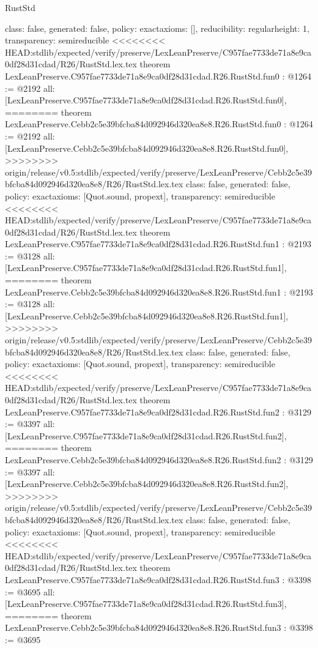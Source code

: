 \begin{lexlean}{RustStd}
\begin{coremodule}
{\begin{coremodule}
{{{  class: false,
  generated: false,
  policy: exact{axioms: []},
  reducibility: regular{height: 1},
  transparency: semireducible
}
<<<<<<<< HEAD:stdlib/expected/verify/preserve/LexLeanPreserve/C957fae7733de71a8e9ca0df28d31cdad/R26/RustStd.lex.tex
theorem LexLeanPreserve.C957fae7733de71a8e9ca0df28d31cdad.R26.RustStd.fun0 : @1264 := @2192 {
  all: [LexLeanPreserve.C957fae7733de71a8e9ca0df28d31cdad.R26.RustStd.fun0],
========
theorem LexLeanPreserve.Cebb2c5e39bfcba84d092946d320ea8e8.R26.RustStd.fun0 : @1264 := @2192 {
  all: [LexLeanPreserve.Cebb2c5e39bfcba84d092946d320ea8e8.R26.RustStd.fun0],
>>>>>>>> origin/release/v0.5:stdlib/expected/verify/preserve/LexLeanPreserve/Cebb2c5e39bfcba84d092946d320ea8e8/R26/RustStd.lex.tex
  class: false,
  generated: false,
  policy: exact{axioms: [Quot.sound, propext]},
  transparency: semireducible
}
<<<<<<<< HEAD:stdlib/expected/verify/preserve/LexLeanPreserve/C957fae7733de71a8e9ca0df28d31cdad/R26/RustStd.lex.tex
theorem LexLeanPreserve.C957fae7733de71a8e9ca0df28d31cdad.R26.RustStd.fun1 : @2193 := @3128 {
  all: [LexLeanPreserve.C957fae7733de71a8e9ca0df28d31cdad.R26.RustStd.fun1],
========
theorem LexLeanPreserve.Cebb2c5e39bfcba84d092946d320ea8e8.R26.RustStd.fun1 : @2193 := @3128 {
  all: [LexLeanPreserve.Cebb2c5e39bfcba84d092946d320ea8e8.R26.RustStd.fun1],
>>>>>>>> origin/release/v0.5:stdlib/expected/verify/preserve/LexLeanPreserve/Cebb2c5e39bfcba84d092946d320ea8e8/R26/RustStd.lex.tex
  class: false,
  generated: false,
  policy: exact{axioms: [Quot.sound, propext]},
  transparency: semireducible
}
<<<<<<<< HEAD:stdlib/expected/verify/preserve/LexLeanPreserve/C957fae7733de71a8e9ca0df28d31cdad/R26/RustStd.lex.tex
theorem LexLeanPreserve.C957fae7733de71a8e9ca0df28d31cdad.R26.RustStd.fun2 : @3129 := @3397 {
  all: [LexLeanPreserve.C957fae7733de71a8e9ca0df28d31cdad.R26.RustStd.fun2],
========
theorem LexLeanPreserve.Cebb2c5e39bfcba84d092946d320ea8e8.R26.RustStd.fun2 : @3129 := @3397 {
  all: [LexLeanPreserve.Cebb2c5e39bfcba84d092946d320ea8e8.R26.RustStd.fun2],
>>>>>>>> origin/release/v0.5:stdlib/expected/verify/preserve/LexLeanPreserve/Cebb2c5e39bfcba84d092946d320ea8e8/R26/RustStd.lex.tex
  class: false,
  generated: false,
  policy: exact{axioms: [Quot.sound, propext]},
  transparency: semireducible
}
<<<<<<<< HEAD:stdlib/expected/verify/preserve/LexLeanPreserve/C957fae7733de71a8e9ca0df28d31cdad/R26/RustStd.lex.tex
theorem LexLeanPreserve.C957fae7733de71a8e9ca0df28d31cdad.R26.RustStd.fun3 : @3398 := @3695 {
  all: [LexLeanPreserve.C957fae7733de71a8e9ca0df28d31cdad.R26.RustStd.fun3],
========
theorem LexLeanPreserve.Cebb2c5e39bfcba84d092946d320ea8e8.R26.RustStd.fun3 : @3398 := @3695 {
}}}}}}}
\end{coremodule}}
\end{coremodule}
\end{lexlean}
